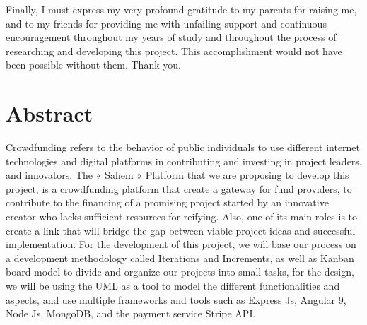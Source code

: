 Finally, I must express my very profound gratitude to my parents for raising me, and to my friends for providing me with unfailing support and continuous encouragement throughout my years of study and throughout the process of researching and developing this project.
This accomplishment would not have been possible without them. Thank you.

\cleardoublepage%
\chapter*{Abstract}




Crowdfunding refers to the behavior of public individuals to use different internet technologies and
digital platforms in contributing and investing in project leaders, and innovators.
The « Sahem » Platform that we are proposing to develop this project, is a crowdfunding platform that 
create a gateway for fund providers, to contribute to the financing of a promising project started by
an innovative creator who lacks sufficient resources for reifying.
Also, one of its main roles is to create a link that will bridge the gap between viable project ideas
and successful implementation.
For the development of this project, we will base our process on a development methodology called Iterations
and Increments, as well as Kanban board model to divide and organize our projects into small tasks,
for the design, we will be using the UML as a tool to model the different functionalities and aspects,
and use multiple frameworks and tools such as Express Js, Angular 9, Node Js, MongoDB, and the payment service
Stripe API.

